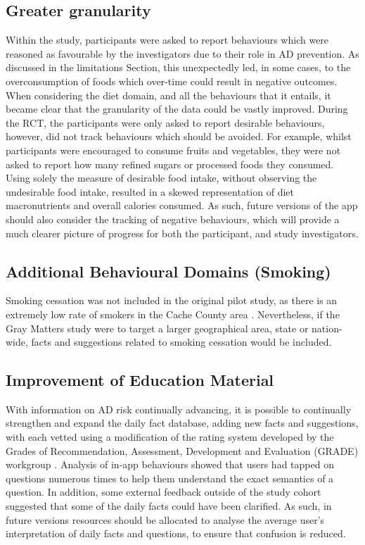 \subsection{Greater granularity}
Within the study, participants were asked to report behaviours which were reasoned as favourable by the investigators due to their role in AD prevention. As discussed in the limitations Section, this unexpectedly led, in some cases, to the overconsumption of foods which over-time could result in negative outcomes. When considering the diet domain, and all the behaviours that it entails, it became clear that the granularity of the data could be vastly improved. During the RCT, the participants were only asked to report desirable behaviours, however, did not track behaviours which should be avoided. For example, whilst participants were encouraged to consume fruits and vegetables, they were not asked to report how many refined sugars or processed foods they consumed. Using solely the measure of desirable food intake, without observing the undesirable food intake, resulted in a skewed representation of diet macronutrients and overall calories consumed.
As such, future versions of the app should also consider the tracking of negative behaviours, which will provide a much clearer picture of progress for both the participant, and study investigators.

\subsection{Additional Behavioural Domains (Smoking)}
Smoking cessation was not included in the original pilot study, as there is an extremely low rate of smokers in the Cache County area \cite{UtahDepartmentofHealth2014}. Nevertheless, if the Gray Matters study were to target a larger geographical area, state or nation-wide, facts and suggestions related to smoking cessation would be included.

\subsection{Improvement of Education Material}
With information on AD risk continually advancing, it is possible to continually strengthen and expand the daily fact database, adding new facts and suggestions, with each vetted using a modification of the rating system developed by the Grades of Recommendation, Assessment, Development and Evaluation (GRADE) workgroup \cite{Dijkers2013}. Analysis of in-app behaviours showed that users had tapped on questions numerous times to help them understand the exact semantics of a question. In addition, some external feedback outside of the study cohort suggested that some of the daily facts could have been clarified. As such, in future versions resources should be allocated to analyse the average user’s interpretation of daily facts and questions, to ensure that confusion is reduced.

